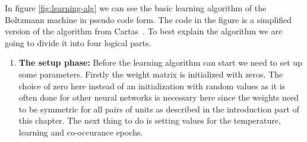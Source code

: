 \documentclass[12pt,twoside]{article}
\theoremstyle{plain}
\theoremstyle{definition}
\theoremstyle{remark}
\begin{document}
In figure \cref{fig:learning-alg} we can see the basic learning algorithm of the Boltzmann machine in pseudo code form.
The code in the figure is a simplified version of the algorithm from Cartas~\cite{BMImpl}.
To best explain the algorithm we are going to divide it into four logical parts.
\begin{enumerate}
    \item \textbf{The setup phase:}\newline
        Before the learning algorithm can start we need to set up some parameters. Firstly the weight matrix is initialized with zeros.
        The choice of zero here instead of an initialization with random values as it is often done for other neural networks is
        necessary here since the weights need to be symmetric for all pairs of units as described in the introduction part of this chapter.
        The next thing to do is setting values for the temperature, learning and co-occurance epochs. 
        

\end{enumerate}
\end{document}

